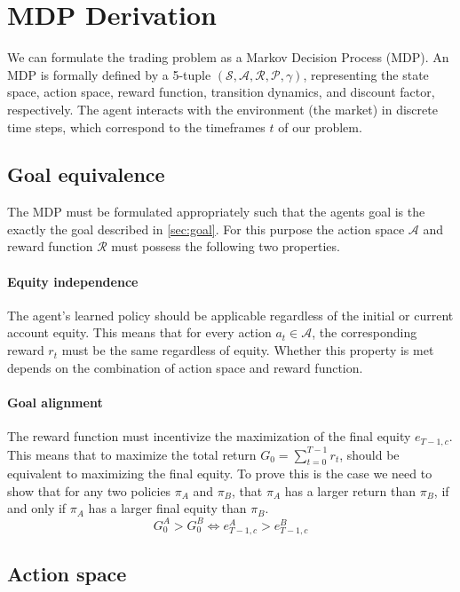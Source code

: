 \section{MDP Derivation}
\label{sec:mdp}

We can formulate the trading problem as a Markov Decision Process (MDP). An MDP is formally defined by a 5-tuple $(\mathcal{S},\mathcal{A},\mathcal{R},\mathcal{P},\gamma)$, representing the state space, action space, reward function, transition dynamics, and discount factor, respectively. The agent interacts with the environment (the market) in discrete time steps, which correspond to the timeframes $t$ of our problem.

\subsection{Goal equivalence}

The MDP must be formulated appropriately such that the agents goal is the exactly the goal described in \ref{sec:goal}. For this purpose the action space $\mathcal{A}$ and reward function $\mathcal{R}$ must possess the following two properties.

\paragraph{Equity independence} The agent's learned policy should be applicable regardless of the initial or current account equity. This means that for every action $a_t \in \mathcal{A}$, the corresponding reward $r_t$ must be the same regardless of equity. Whether this property is met depends on the combination of action space and reward function.

\paragraph{Goal alignment} The reward function must incentivize the maximization of the final equity $e_{T-1,c}$. This means that to maximize the total return $G_0=\sum_{t=0}^{T-1}{r_t}$, should be equivalent to maximizing the final equity. To prove this is the case we need to show that for any two policies $\pi_A$ and $\pi_B$, that $\pi_A$ has a larger return than $\pi_B$, if and only if $\pi_A$ has a larger final equity than $\pi_B$.
$$
G_0^A > G_0^B \iff e_{T-1,c}^A > e^B_{T-1,c}
$$ 

\subsection{Action space}

